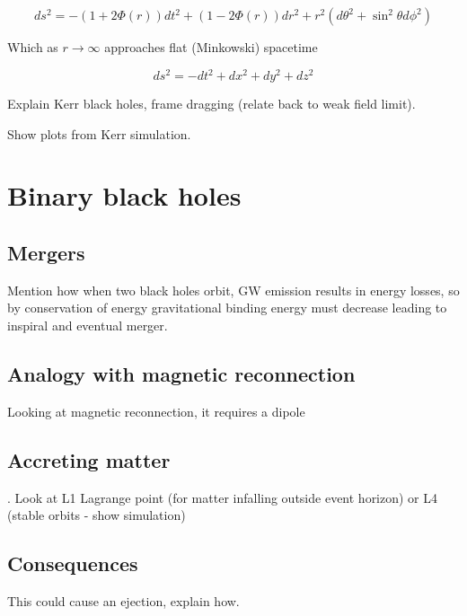 \begin{equation}
    ds^2 = - (1+2\Phi(r)) dt^2 +  (1-2\Phi(r)) dr^2
            + r^2 (d\theta^2+\sin^2\theta d\phi^2)
\label{eq:Weak field metric}
\end{equation}

Which as $r\rightarrow \infty$ approaches flat (Minkowski) spacetime

\begin{equation}
    ds^2 = - dt^2 + dx^2 + dy^2 + dz^2
\label{eq:Minkowski metruc}
\end{equation}

Explain Kerr black holes, frame dragging (relate back to weak field limit).

Show plots from Kerr simulation.

\section{Binary black holes}
\subsection{Mergers}

Mention how when two black holes orbit, GW emission results in energy losses, so by conservation of energy gravitational binding energy must decrease leading to inspiral and eventual merger.


\subsection{Analogy with magnetic reconnection}
Looking at magnetic reconnection, it requires a dipole

\subsection{Accreting matter}
. Look at L1 Lagrange point (for matter infalling outside event horizon) or L4 (stable orbits - show simulation)

\subsection{Consequences}
This could cause an ejection, explain how.